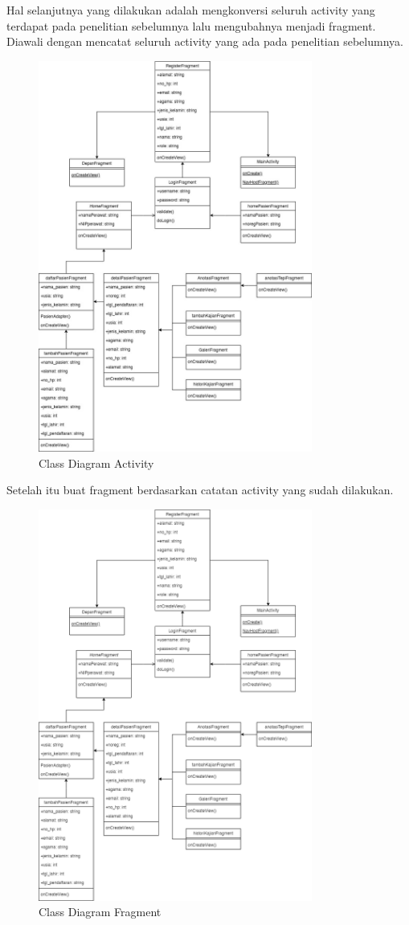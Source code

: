 \begin{enumerate}
	Hal selanjutnya yang dilakukan adalah mengkonversi seluruh activity yang terdapat pada penelitian sebelumnya lalu mengubahnya menjadi fragment. Diawali dengan mencatat seluruh activity yang ada pada penelitian sebelumnya.
	\begin{figure}[H]
		\centering
		\includegraphics[keepaspectratio, width=9cm]{gambar/class_diagram}
		\caption{Class Diagram Activity}
		\label{gambar:class_diagram_activity}
	\end{figure}
	
	Setelah itu buat fragment berdasarkan catatan activity yang sudah dilakukan.
	\begin{figure}[H]
		\centering
		\includegraphics[keepaspectratio, width=9cm]{gambar/class_diagram_fragment}
		\caption{Class Diagram Fragment}
		\label{gambar:class_diagram_fragment}
	\end{figure}
	

\end{enumerate}
